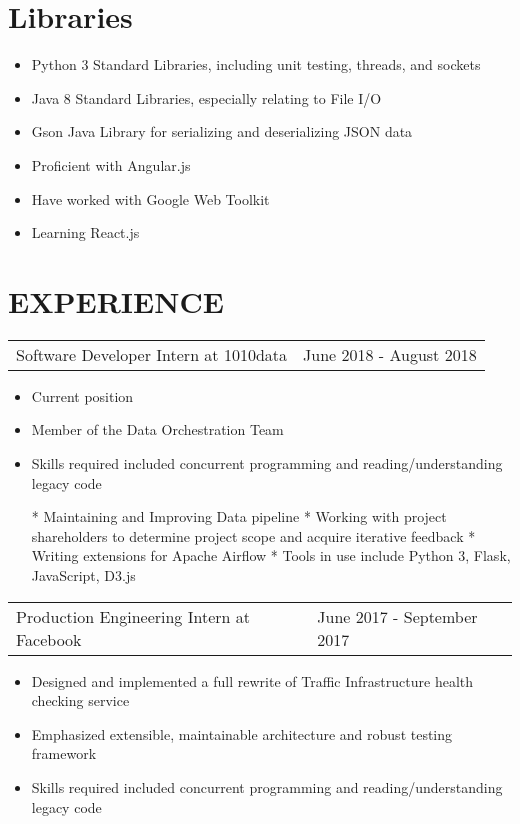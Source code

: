 \documentclass[margin]{res}
\begin{document}
\begin{resume}
\normalsize{\section{Libraries}}
    \begin{itemize} \itemsep -2pt
        \item Python 3 Standard Libraries, including unit testing, threads, and sockets
        \item Java 8 Standard Libraries, especially relating to File I/O
        \item Gson Java Library for serializing and deserializing JSON data
        \item Proficient with Angular.js
        \item Have worked with Google Web Toolkit
        \item Learning React.js
    \end{itemize}
 


\section{EXPERIENCE}      

    \begin{tabular}{p{3.5in} p{3in}} %
        Software Developer Intern at 1010data & June 2018 - August 2018
    \end{tabular}
    \begin{itemize} \itemsep -2pt
        \item Current position
        \item Member of the Data Orchestration Team
        \item Skills required included concurrent programming and reading/understanding legacy code

* Maintaining and Improving Data pipeline
* Working with project shareholders to determine project scope and acquire iterative feedback
* Writing extensions for Apache Airflow
* Tools in use include Python 3, Flask, JavaScript, D3.js
    \end{itemize}

    \begin{tabular}{p{3.5in} p{3in}} %
        Production Engineering Intern at Facebook & June 2017 - September 2017
    \end{tabular}
    \begin{itemize} \itemsep -2pt
        \item Designed and implemented a full rewrite of Traffic Infrastructure health checking service
        \item Emphasized extensible, maintainable architecture and robust testing framework
        \item Skills required included concurrent programming and reading/understanding legacy code
    \end{itemize}



\end{resume}
\end{document}

